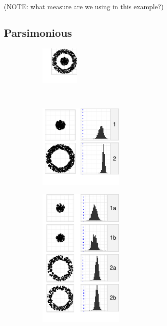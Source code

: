(NOTE: what measure are we using in this example?)

\subsection{Parsimonious}
  \begin{figure}
    \centering
    \begin{minipage}[b]{1.7in}
       \begin{subfigure}[b]{\linewidth}
  	\includegraphics[width=0.75in]{images/donut1-donut2.pdf}
      \caption{}
      \label{fig:pars1}
      \end{subfigure}\\[\baselineskip]
      \begin{subfigure}[b]{\linewidth}
  	\includegraphics[width=1.65in]{images/19_5065416601259-cluster.pdf}
      \caption{}
      \label{fig:pars2}
      \end{subfigure}
      \begin{subfigure}[b]{\linewidth}
  	\includegraphics[width=1.65in]{images/9_27395081160431-cluster1.pdf}
        \caption{}
      \label{fig:pars3}        
      \end{subfigure}
    \end{minipage}

\end{figure}
